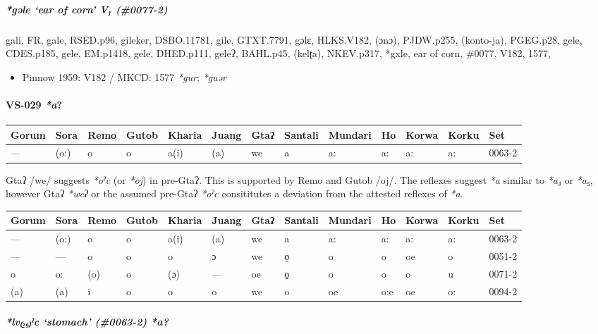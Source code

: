 \documentclass[a4paper,]{article}
\providecommand{\tightlist}{%
  \setlength{\itemsep}{0pt}\setlength{\parskip}{0pt}}
\let\oldparagraph\paragraph
\renewcommand{\paragraph}[1]{\oldparagraph{#1}\mbox{}}
\let\oldsubparagraph\subparagraph
\renewcommand{\subparagraph}[1]{\oldsubparagraph{#1}\mbox{}}
\begin{document}
\subparagraph{\texorpdfstring{\emph{*gəle} `ear of corn' V₁
(\#0077-2)}{*gəle ear of corn V₁ (\#0077-2)}}\label{gux259le-ear-of-corn-v-0077-2}

gali, FR, gale, RSED.p96, gileker, DSBO.11781, gile, GTXT.7791, gɔlɛ,
HLKS.V182, (ɔnɔ), PJDW.p255, (konto-ja), PGEG.p28, gele, CDES.p185,
gele, EM.p1418, gele, DHED.p111, geleʔ, BAHL.p45, (kelʈa), NKEV.p317,
*gxle, ear of corn, \#0077, V182, 1577,

\begin{itemize}
\tightlist
\item
  Pinnow 1959: V182 / MKCD: 1577 \emph{*gur}; \emph{*guər}
\end{itemize}

\paragraph{\texorpdfstring{VS-029
\emph{*a}?}{VS-029 *a?}}\label{vs-029-a}

\begin{longtable}[]{@{}lllllllllllll@{}}
\toprule
Gorum & Sora & Remo & Gutob & Kharia & Juang & Gtaʔ & Santali & Mundari
& Ho & Korwa & Korku & Set\tabularnewline
\midrule
\endhead
--- & (o:) & o & o & a(i) & (a) & we & a & a: & a: & a: & a: &
0063-2\tabularnewline
\bottomrule
\end{longtable}

Gtaʔ /we/ suggests \emph{*oˀc} (or \emph{*oj}) in pre-Gtaʔ. This is
supported by Remo and Gutob /oj/. The reflexes suggest \emph{*a} similar
to \emph{*a₄} or \emph{*a₅}, however Gtaʔ \emph{*weʔ} or the assumed
pre-Gtaʔ \emph{*oˀc} consititutes a deviation from the attested reflexes
of \emph{*a}.

\begin{longtable}[]{@{}lllllllllllll@{}}
\toprule
Gorum & Sora & Remo & Gutob & Kharia & Juang & Gtaʔ & Santali & Mundari
& Ho & Korwa & Korku & Set\tabularnewline
\midrule
\endhead
--- & (o:) & o & o & a(i) & (a) & we & a & a: & a: & a: & a: &
0063-2\tabularnewline
--- & --- & o & o & o & ɔ & we & o̠ & o & o & oe & o &
0051-2\tabularnewline
o & o: & (o) & o & (ɔ) & --- & oe & o̠ & o & o & o & u &
0071-2\tabularnewline
(a) & (a) & i & o & o & o & we & o & oe & o:e & oe & o: &
0094-2\tabularnewline
\bottomrule
\end{longtable}

\subparagraph{\texorpdfstring{\emph{*lv₍₂₉₎ˀc} `stomach' (\#0063-2)
\emph{*a}?}{*lv₍₂₉₎ˀc stomach (\#0063-2) *a?}}\label{lvux2c0c-stomach-0063-2-a}
\end{document}
